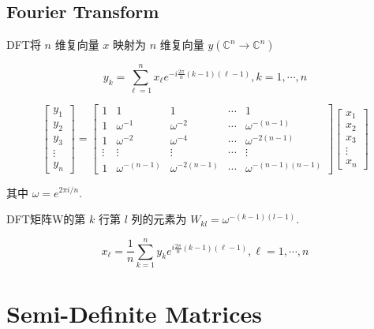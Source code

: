 \subsection{Fourier Transform}

\begin{definition}
    DFT将 $ n $ 维复向量 $ x $ 映射为 $ {n} $ 维复向量 $ y\left(\mathbb{C}^{n} \rightarrow \mathbb{C}^{n}\right) $

    $$ y_{k}=\sum_{\ell=1}^{n} x_{\ell} e^{-i \frac{2 \pi}{n}(k-1)(\ell-1)}, k=1, \cdots, n $$

    $$ \left[\begin{array}{c}y_{1} \\ y_{2} \\ y_{3} \\ \vdots \\ y_{n}\end{array}\right]=\left[\begin{array}{ccccc}1 & 1 & 1 & \cdots & 1 \\ 1 & \omega^{-1} & \omega^{-2} & \cdots & \omega^{-(n-1)} \\ 1 & \omega^{-2} & \omega^{-4} & \cdots & \omega^{-2(n-1)} \\ \vdots & \vdots & \vdots & \cdots & \vdots \\ 1 & \omega^{-(n-1)} & \omega^{-2(n-1)} & \cdots & \omega^{-(n-1)(n-1)}\end{array}\right]\left[\begin{array}{c}x_{1} \\ x_{2} \\ x_{3} \\ \vdots \\ x_{n}\end{array}\right] $$

   其中 $ \omega=e^{2 \pi i / n} $.
\end{definition}

DFT矩阵W的第 $ k $ 行第 $ l $ 列的元素为 $ W_{k l}=\omega^{-(k-1)(l-1)} $.

\begin{definition}
    $$ x_{\ell}=\frac{1}{n} \sum_{k=1}^{n} y_{k} e^{i \frac{2 \pi}{n}(k-1)(\ell-1)}, \ell=1, \cdots, n $$
\end{definition}

\section{Semi-Definite Matrices}

